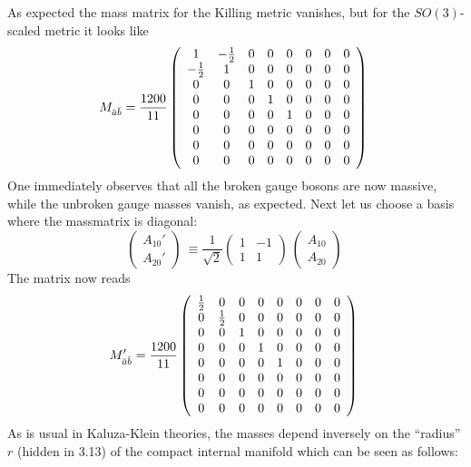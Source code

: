 \documentclass[a4paper,12pt]{article}
\begin{document}
As expected the mass matrix for the Killing metric vanishes, but for the $SO(3)$-scaled metric it looks like
\begin{equation}
M_{\breve{a}\breve{b}}=\frac{1200}{11}\left( \begin{array}{cccccccc}
1& -\textstyle{1\over 2}&0&0&0&0&0&0\\
-\textstyle{1\over 2}& 1&0&0&0&0&0&0\\
0& 0  &1&0&0&0&0&0\\
0& 0  &0&1&0&0&0&0\\
0& 0  &0&0&1&0&0&0\\
0& 0  &0&0&0&0&0&0\\
0& 0  &0&0&0&0&0&0\\
0& 0  &0&0&0&0&0&0
\end{array} \right)\ 
\end{equation}
One immediately observes that all the broken gauge bosons are now massive,  while the unbroken gauge masses vanish, as expected. Next let us choose a basis where the massmatrix is diagonal:
\begin{equation}
\left( \begin{array}{c}
A_{10}'\\
A_{20}' 
\end{array} \right)\ \equiv 
\frac{1}{\sqrt{2}}\left( \begin{array}{cc}
1& -1\\
1& 1  
\end{array} \right)\ \left( \begin{array}{c}
A_{10}\\
A_{20} 
\end{array} \right)\ 
\end{equation}
The matrix now reads
\begin{equation}
M_{\breve{a}\breve{b}}'=\frac{1200}{11}\left( \begin{array}{cccccccc}
\textstyle{1\over 2}& 0&0&0&0&0&0&0\\
0 & \textstyle{1\over 2}&0&0&0&0&0&0\\
0& 0  &1&0&0&0&0&0\\
0& 0  &0&1&0&0&0&0\\
0& 0  &0&0&1&0&0&0\\
0& 0  &0&0&0&0&0&0\\
0& 0  &0&0&0&0&0&0\\
0& 0  &0&0&0&0&0&0
\end{array} \right)\ 
\end{equation}
As is usual in Kaluza-Klein theories, the masses depend inversely on the ``radius'' $r$ (hidden in 3.13) of the compact internal manifold which can be seen as follows: 
\end{document}
